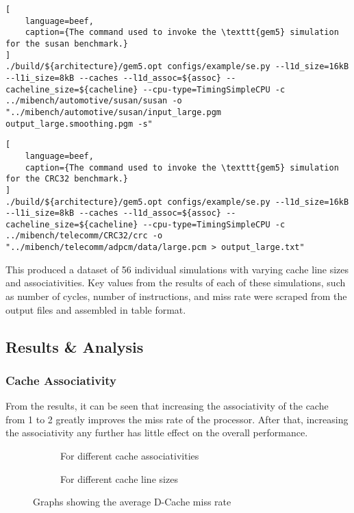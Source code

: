 \begin{lstlisting}[
    language=beef,
    caption={The command used to invoke the \texttt{gem5} simulation for the susan benchmark.}
]
./build/${architecture}/gem5.opt configs/example/se.py --l1d_size=16kB --l1i_size=8kB --caches --l1d_assoc=${assoc} --cacheline_size=${cacheline} --cpu-type=TimingSimpleCPU -c ../mibench/automotive/susan/susan -o "../mibench/automotive/susan/input_large.pgm output_large.smoothing.pgm -s"
\end{lstlisting}

\begin{lstlisting}[
    language=beef,
    caption={The command used to invoke the \texttt{gem5} simulation for the CRC32 benchmark.}
]
./build/${architecture}/gem5.opt configs/example/se.py --l1d_size=16kB --l1i_size=8kB --caches --l1d_assoc=${assoc} --cacheline_size=${cacheline} --cpu-type=TimingSimpleCPU -c ../mibench/telecomm/CRC32/crc -o "../mibench/telecomm/adpcm/data/large.pcm > output_large.txt"
\end{lstlisting}

This produced a dataset of 56 individual simulations with varying cache line sizes and 
associativities.
Key values from the results of each of these simulations, such as number of cycles, 
number of instructions, and miss rate were scraped from the output files and assembled 
in table format.

\subsection{Results \& Analysis}

\subsubsection{Cache Associativity}

From the results, it can be seen that increasing the associativity of the cache from 
1 to 2 greatly improves the miss rate of the processor. After that, increasing the 
associativity any further has little effect on the overall performance.


\begin{figure}[H]%
\begin{subfigure}{.5\textwidth}
    \centering
    
    \caption{For different cache associativities}
    \label{fig:partb-assoc}
\end{subfigure}%
\hfill%
\begin{subfigure}{.5\textwidth}
    \centering
    
    \caption{For different cache line sizes}
    \label{fig:partb-cacheln}
\end{subfigure}%
\caption{Graphs showing the average D-Cache miss rate}
\label{fig:partb-avgs}
\end{figure}

